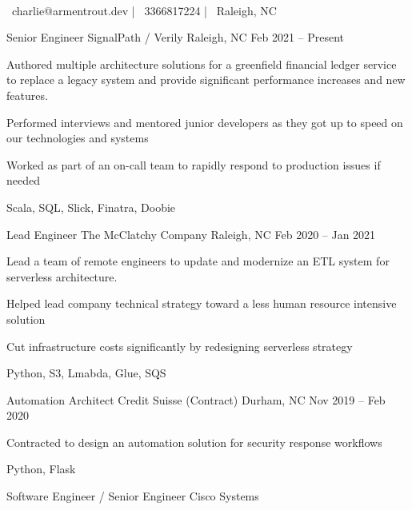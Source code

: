 \documentclass[]{awesome-cv}
\begin{document}
    
\begin{center}
	 \\
	\vspace{2mm}
	{\faEnvelope\ charlie@armentrout.dev} | {\faMobile\ 3366817224} | {\faMapMarker\ Raleigh, NC}
\end{center}
\begin{cventries}
	\cventry
	{Senior Engineer}
	{SignalPath / Verily}
	{Raleigh, NC}
	{Feb 2021 – Present}
	{\begin{cvitems}
		\item {Authored multiple architecture solutions for a greenfield financial ledger service to replace a legacy system and provide significant performance increases and new features.}
		\item {Performed interviews and mentored junior developers as they got up to speed on our technologies and systems}
		\item {Worked as part of an on-call team to rapidly respond to production issues if needed}
		\item {Scala, SQL, Slick, Finatra, Doobie}
		\end{cvitems}}
	\cventry
	{Lead Engineer}
	{The McClatchy Company}
	{Raleigh, NC}
	{Feb 2020 – Jan 2021}
	{\begin{cvitems}
		\item {Lead a team of remote engineers to update and modernize an ETL system for serverless architecture.}
		\item {Helped lead company technical strategy toward a less human resource intensive solution}
		\item {Cut infrastructure costs significantly by redesigning serverless strategy}
		\item {Python, S3, Lmabda, Glue, SQS}
		\end{cvitems}}
	\cventry
	{Automation Architect}
	{Credit Suisse (Contract)}
	{Durham, NC}
	{Nov 2019 – Feb 2020}
	{\begin{cvitems}
		\item {Contracted to design an automation solution for security response workflows}
		\item {Python, Flask}
		\end{cvitems}}
	\cventry
	{Software Engineer / Senior Engineer}
	{Cisco Systems}

\end{cventries}
\end{document}
